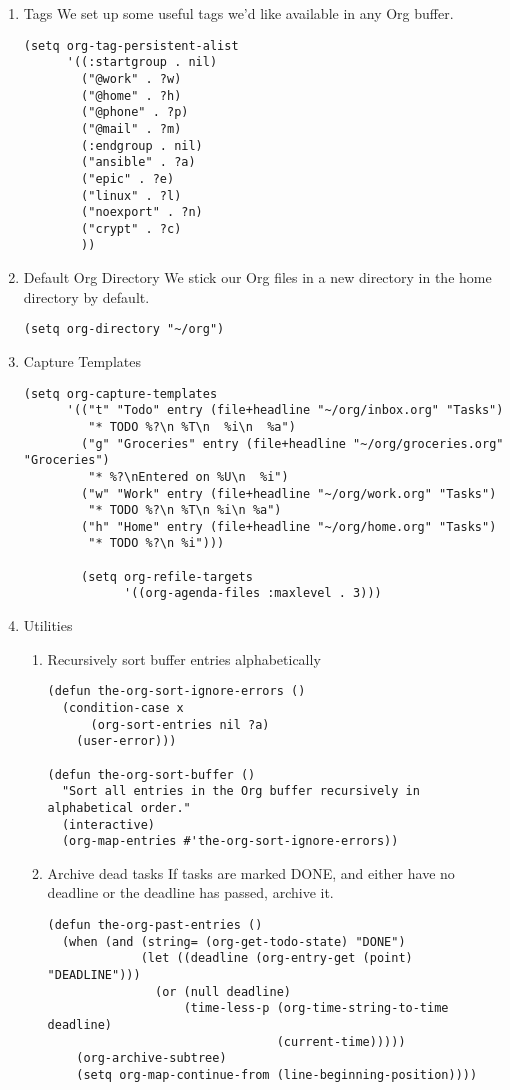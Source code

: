 \documentclass[11pt]{article}
\begin{document}
\begin{enumerate}
\begin{enumerate}
\item Tags
\label{sec:org77f1c61}
We set up some useful tags we'd like available in any Org buffer.
\begin{verbatim}
(setq org-tag-persistent-alist
      '((:startgroup . nil)
        ("@work" . ?w)
        ("@home" . ?h)
        ("@phone" . ?p)
        ("@mail" . ?m)
        (:endgroup . nil)
        ("ansible" . ?a)
        ("epic" . ?e)
        ("linux" . ?l)
        ("noexport" . ?n)
        ("crypt" . ?c)
        ))
\end{verbatim}
\item Default Org Directory
\label{sec:org97bc7af}
We stick our Org files in a new directory in the home directory by
default.
\begin{verbatim}
(setq org-directory "~/org")
\end{verbatim}
\item Capture Templates
\label{sec:org3a1ba59}
\begin{verbatim}
(setq org-capture-templates
      '(("t" "Todo" entry (file+headline "~/org/inbox.org" "Tasks")
         "* TODO %?\n %T\n  %i\n  %a")
        ("g" "Groceries" entry (file+headline "~/org/groceries.org" "Groceries")
         "* %?\nEntered on %U\n  %i")
        ("w" "Work" entry (file+headline "~/org/work.org" "Tasks")
         "* TODO %?\n %T\n %i\n %a")
        ("h" "Home" entry (file+headline "~/org/home.org" "Tasks")
         "* TODO %?\n %i")))

        (setq org-refile-targets
              '((org-agenda-files :maxlevel . 3)))
\end{verbatim}
\item Utilities
\label{sec:org8355db8}
\begin{enumerate}
\item Recursively sort buffer entries alphabetically
\label{sec:org904687f}
\begin{verbatim}
(defun the-org-sort-ignore-errors ()
  (condition-case x
      (org-sort-entries nil ?a)
    (user-error)))

(defun the-org-sort-buffer ()
  "Sort all entries in the Org buffer recursively in alphabetical order."
  (interactive)
  (org-map-entries #'the-org-sort-ignore-errors))
\end{verbatim}

\item Archive dead tasks
\label{sec:org0bd4a7d}
If tasks are marked DONE, and either have no deadline or the deadline
has passed, archive it.

\begin{verbatim}
(defun the-org-past-entries ()
  (when (and (string= (org-get-todo-state) "DONE")
             (let ((deadline (org-entry-get (point) "DEADLINE")))
               (or (null deadline)
                   (time-less-p (org-time-string-to-time deadline)
                                (current-time)))))
    (org-archive-subtree)
    (setq org-map-continue-from (line-beginning-position))))



\end{verbatim}
\end{enumerate}
\end{enumerate}
\end{enumerate}
\end{document}
